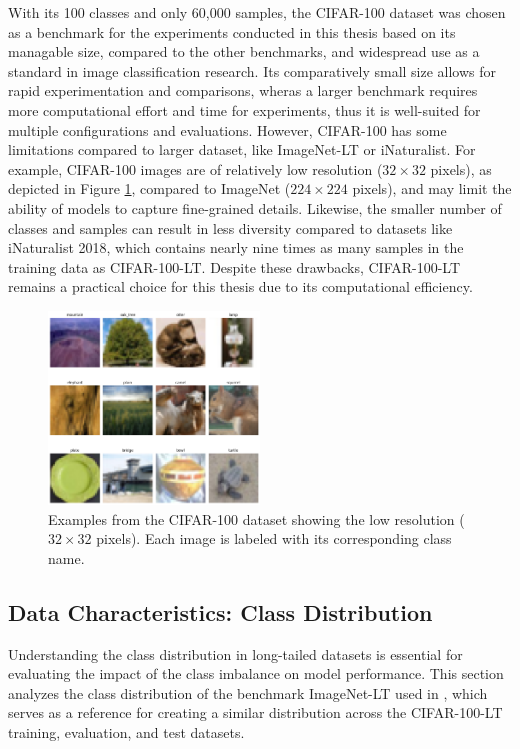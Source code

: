 \noindent With its 100 classes and only 60,000 samples, the CIFAR-100 dataset was chosen as a benchmark for the experiments conducted in this thesis based on its managable size, compared to the other benchmarks, and widespread use as a standard in image classification research. Its comparatively small size allows for rapid experimentation and comparisons, wheras a larger benchmark requires more computational effort and time for experiments, thus it is well-suited for multiple configurations and evaluations. However, CIFAR-100 has some limitations compared to larger dataset, like ImageNet-LT or iNaturalist. For example, CIFAR-100 images are of relatively low resolution ($32 \times 32$ pixels), as depicted in Figure \ref{fig:cifar100_images}, compared to ImageNet ($224 \times 224$ pixels), and may limit the ability of models to capture fine-grained details. Likewise, the smaller number of classes and samples can result in less diversity compared to datasets like iNaturalist 2018, which contains nearly nine times as many samples in the training data as CIFAR-100-LT. Despite these drawbacks, CIFAR-100-LT remains a practical choice for this thesis due to its computational efficiency. 

\begin{figure}[h!]
    \centering
    \includegraphics[width=0.5\textwidth]{Images/cifar100_sample_grid.png}
    \caption{Examples from the CIFAR-100 dataset showing the low resolution ($32 \times 32$ pixels). Each image is labeled with its corresponding class name.}
    \label{fig:cifar100_images}
\end{figure}

\subsection{Data Characteristics: Class Distribution}
Understanding the class distribution in long-tailed datasets is essential for evaluating the impact of the class imbalance on model performance. This section analyzes the class distribution of the benchmark ImageNet-LT used in \cite{zhang2023deep}, which serves as a reference for creating a similar distribution across the CIFAR-100-LT training, evaluation, and test datasets.  

